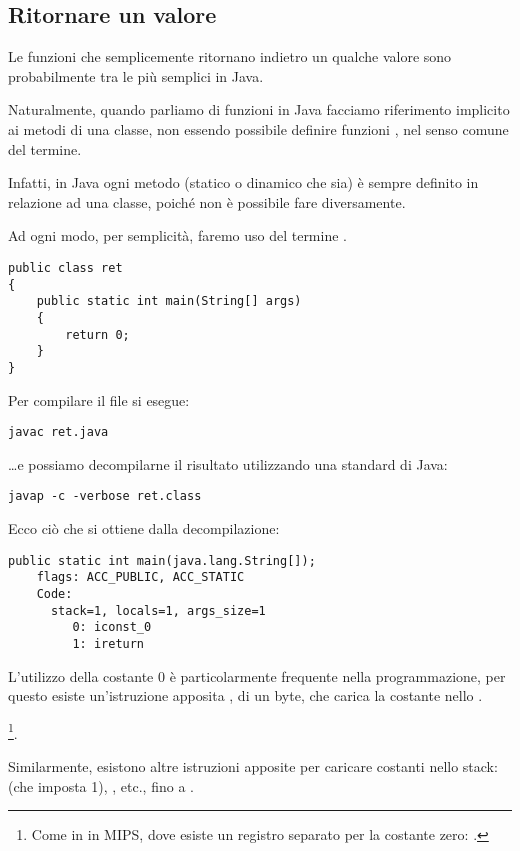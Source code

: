\subsection{Ritornare un valore}

Le funzioni che semplicemente ritornano indietro un qualche valore sono probabilmente tra le più semplici in Java.

Naturalmente, quando parliamo di funzioni in Java facciamo riferimento implicito ai metodi di una classe, 
non essendo possibile definire funzioni , nel senso comune del termine.

Infatti, in Java ogni metodo (statico o dinamico che sia) è sempre definito in relazione ad una classe, 
poiché non è possibile fare diversamente.

Ad ogni modo, per semplicità, faremo uso del termine .

\begin{lstlisting}[style=customjava]
public class ret
{
	public static int main(String[] args)
	{
		return 0;
	}
}
\end{lstlisting}

Per compilare il file si esegue:

\begin{lstlisting}
javac ret.java
\end{lstlisting}

\dots e possiamo decompilarne il risultato utilizzando una  standard di Java:

\begin{lstlisting}
javap -c -verbose ret.class
\end{lstlisting}

Ecco ciò che si ottiene dalla decompilazione:

\begin{lstlisting}[caption=JDK 1.7 (excerpt)]
  public static int main(java.lang.String[]);
    flags: ACC_PUBLIC, ACC_STATIC
    Code:
      stack=1, locals=1, args_size=1
         0: iconst_0
         1: ireturn
\end{lstlisting}

L'utilizzo della costante 0 è particolarmente frequente nella programmazione, 
per questo esiste un'istruzione apposita , di un byte, che carica la costante nello .

\footnote{Come in in MIPS, dove esiste un registro separato per la costante zero: .}.

Similarmente, esistono altre istruzioni apposite per caricare costanti nello stack:  (che imposta 1), 
, etc., fino a .

